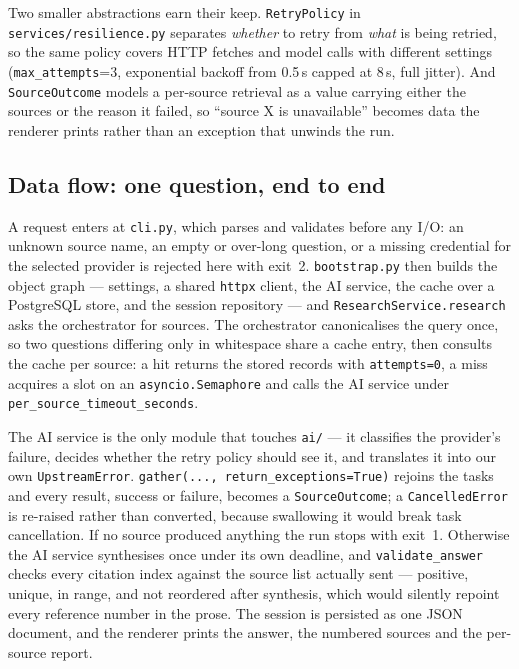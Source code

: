 \documentclass[10pt,a4paper]{article}
\begin{document}
Two smaller abstractions earn their keep. \texttt{RetryPolicy} in
\texttt{services/resilience.py} separates \emph{whether} to retry from \emph{what} is being
retried, so the same policy covers HTTP fetches and model calls with different settings
(\texttt{max\_attempts}=3, exponential backoff from 0.5\,s capped at 8\,s, full jitter). And
\texttt{SourceOutcome} models a per-source retrieval as a value carrying either the sources or
the reason it failed, so ``source X is unavailable'' becomes data the renderer prints rather than
an exception that unwinds the run.

\subsection{Data flow: one question, end to end}

A request enters at \texttt{cli.py}, which parses and validates before any I/O: an unknown source
name, an empty or over-long question, or a missing credential for the selected provider is
rejected here with exit~2. \texttt{bootstrap.py} then builds the
object graph --- settings, a shared \texttt{httpx} client, the AI service, the cache over a
PostgreSQL store, and the session repository --- and \texttt{ResearchService.research} asks the
orchestrator for sources. The orchestrator canonicalises the query once, so two questions
differing only in whitespace share a cache entry, then consults the cache per source: a hit
returns the stored records with \texttt{attempts=0}, a miss acquires a slot on an
\texttt{asyncio.Semaphore} and calls the AI service under \texttt{per\_source\_timeout\_seconds}.

The AI service is the only module that touches \texttt{ai/} --- it classifies the provider's
failure, decides whether the retry policy should see it, and translates it into our own
\texttt{UpstreamError}. \texttt{gather(..., return\_exceptions=True)} rejoins the tasks and every
result, success or failure, becomes a \texttt{SourceOutcome}; a \texttt{CancelledError} is
re-raised rather than converted, because swallowing it would break task cancellation. If no
source produced anything the run stops with exit~1. Otherwise the AI service synthesises once
under its own deadline, and \texttt{validate\_answer} checks every citation index against the
source list actually sent --- positive, unique, in range, and not reordered after synthesis,
which would silently repoint every reference number in the prose. The session is persisted as one
JSON document, and the renderer prints the answer, the numbered sources and the per-source
report.
\end{document}
